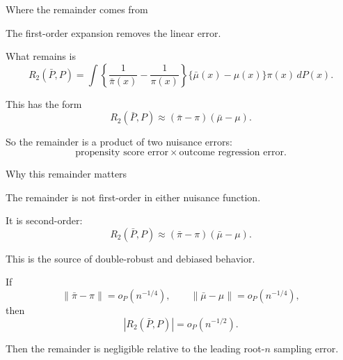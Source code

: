 \documentclass[xcolor={table}, handout]{beamer}
\begin{document}
\note{
\scriptsize \singlespacing

}
\begin{frame}{Where the remainder comes from}

\small

\begin{wideitemize}
\item The first-order expansion removes the linear error.\pause
\item What remains is
\[
R_2(\bar P,P)
  =
  \int
  \left\{
    \frac{1}{\bar\pi(x)}
    -
    \frac{1}{\pi(x)}
  \right\}
  \{\bar\mu(x)-\mu(x)\}
  \pi(x)\,dP(x).
\]\pause
\item This has the form
\[
R_2(\bar P,P)
  \approx
  (\bar\pi-\pi)(\bar\mu-\mu).
\]\pause
\item So the remainder is a product of two nuisance errors:
\[
\text{propensity score error}
\times
\text{outcome regression error}.
\]
\end{wideitemize}

\end{frame}

\note{
\scriptsize \singlespacing

}
\begin{frame}{Why this remainder matters}

\small

\begin{wideitemize}
\item The remainder is not first-order in either nuisance function.\pause
\item It is second-order:
\[
R_2(\bar P,P)
  \approx
  (\bar\pi-\pi)(\bar\mu-\mu).
\]\pause
\item This is the source of double-robust and debiased behavior.\pause
\item If
\[
\|\bar\pi-\pi\|=o_P(n^{-1/4}),
\qquad
\|\bar\mu-\mu\|=o_P(n^{-1/4}),
\]
then
\[
|R_2(\bar P,P)|=o_P(n^{-1/2}).
\]\pause
\item Then the remainder is negligible relative to the leading root-$n$ sampling error.
\end{wideitemize}

\end{frame}
\end{document}
